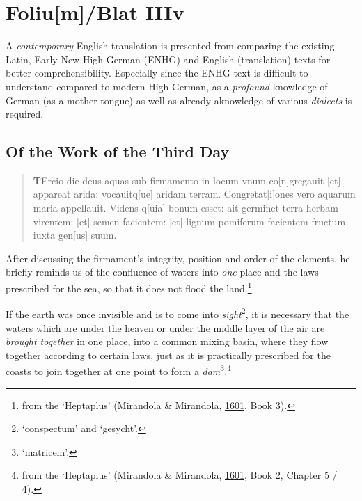 \documentclass[
]{article}
\author{Dietmar Gerald Schrausser}
\date{09.05.2026}
\begin{document}
\hypertarget{foliumblat-iiiv}{%
\section{Foliu{[}m{]}/Blat IIIv}\label{foliumblat-iiiv}}

A \emph{contemporary} English translation is presented from comparing
the existing Latin, Early New High German (ENHG) and English
(translation) texts for better comprehensibility. Especially since the
ENHG text is difficult to understand compared to modern High German, as
a \emph{profound} knowledge of German (as a mother tongue) as well as
already aknowledge of various \emph{dialects} is required.

\hypertarget{of-the-work-of-the-third-day}{%
\subsection{Of the Work of the Third
Day}\label{of-the-work-of-the-third-day}}

\begin{quote}
\textbf{T}Ercio die deus aquas sub firmamento in locum vnum
co{[}n{]}gregauit {[}et{]} appareat arida: vocauitq{[}ue{]} aridam
terram. Congretat{[}i{]}ones vero aquarum maria appellauit. Videns
q{[}uia{]} bonum esset: ait germinet terra herbam virentem: {[}et{]}
semen facientem: {[}et{]} lignum pomiferum facientem fructum iuxta
gen{[}us{]} suum.
\end{quote}

After discussing the firmament's integrity, position and order of the
elements, he briefly reminds us of the confluence of waters into
\emph{one} place and the laws prescribed for the sea, so that it does
not flood the land.\footnote{from the `Heptaplus' (Mirandola \&
  Mirandola, \href{https://doi.org/10.3931/e-rara-61217}{1601}, Book 3).}

If the earth was once invisible and is to come into
\emph{sight}\footnote{`conspectum' and `gesycht'.}, it is necessary that
the waters which are under the heaven or under the middle layer of the
air are \emph{brought together} in one place, into a common mixing
basin, where they flow together according to certain laws, just as it is
practically prescribed for the coasts to join together at one point to
form a \emph{dam}\footnote{`matricem'.}.\footnote{from the `Heptaplus'
  (Mirandola \& Mirandola,
  \href{https://doi.org/10.3931/e-rara-61217}{1601}, Book 2, Chapter 5 /
  4).}
\end{document}
